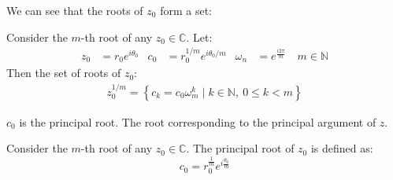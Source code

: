 \documentclass[12pt, english]{book}
\begin{document}
	We can see that the roots of $z_0$ form a set:
	\begin{definition}
		\label{Set of roots of z - Complex}
		Consider the $m$-th root of any $z_0 \in \mathbb{C}$. Let: 
		\begin{align*}
			z_0 &= r_0 e^{i\theta_0}
			&c_0 &= r_0^{1/m} e^{i\theta_0/m} 
			&\omega_n &= e^{\frac{i2\pi}{m}} & \ m \in \mathbb{N}
		\end{align*}
		Then the set of roots of $z_0$:
		\begin{align*}
			z_0^{1/m} = \left\{c_k = c_0 \omega_m^k \mid k\in \mathbb{N}, \ 0 \leq k < m\right\}
		\end{align*}
	\end{definition}
	$c_0$ is the principal root. The root corresponding to the principal argument of $z$.
	\begin{definition}
	Consider the $m$-th root of any $z_0 \in \mathbb{C}$. The principal root of $z_0$ is defined as:
		$$c_0 = r_0^{\frac{1}{m}} e^{i\frac{\theta_0}{m}}$$
	\end{definition}
	
\end{document}
